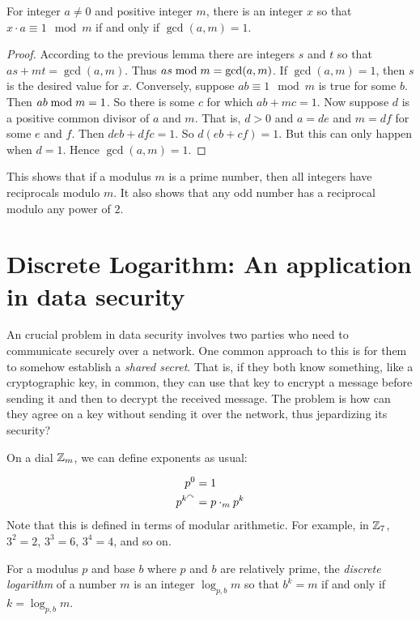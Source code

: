 \begin{thm}
	For integer $a\neq 0$ and positive integer $m$, there is an integer $x$ so that $x\cdot a\equiv 1\mod m$ if and only if $\gcd(a,m)=1$.
	
	\begin{proof}
		According to the previous lemma there are integers $s$ and $t$ so that $as+mt = \gcd(a,m)$.
		Thus $as\bmod m = \gcd(a,m)$.
		If $\gcd(a,m)=1$, then $s$ is the desired value for $x$.
		Conversely, suppose $ab\equiv 1\mod m$ is true for some $b$.
		Then $ab\bmod m = 1$.
		So there is some $c$ for which $ab + mc = 1$.
		Now suppose $d$ is a positive common divisor of $a$ and $m$.
		That is, $d>0$ and $a = de$ and $m = df$ for some $e$ and $f$.
		Then $deb + dfc = 1$.
		So $d(eb + cf) = 1$.
		But this can only happen when $d=1$.
		Hence $\gcd(a,m)=1$.
	\end{proof}
\end{thm}

This shows that if a modulus $m$ is a prime number, then all integers have reciprocals modulo $m$.
It also shows that any odd number has a reciprocal modulo any power of $2$.

\section{Discrete Logarithm: An application in data security}

An crucial problem in data security involves two parties who need to communicate securely over a network. 
One common approach to this is for them to somehow establish a \emph{shared secret}. 
That is, if they both know something, like a cryptographic key, in common, they can use that key to encrypt a message before sending it and then to decrypt the received message.
The problem is how can they agree on a key without sending it over the network, thus jepardizing its security?

On a dial ${\mathbb Z}_m$, we can define exponents as usual:

\begin{align*}
	p^0 &= 1\\
	p^{k^\curvearrowright} &= p\cdot_m p^k
\end{align*}
Note that this is defined in terms of modular arithmetic. 
For example, in ${\mathbb Z}_7$, $3^2 = 2$, $3^3 = 6$, $3^4=4$, and so on.

For a modulus $p$ and base $b$ where $p$ and $b$ are relatively prime, the \emph{discrete logarithm} of a number $m$ is an integer $\log_{p,b} m$ so that $b^k = m$ if and only if $k = \log_{p,b}m$.

